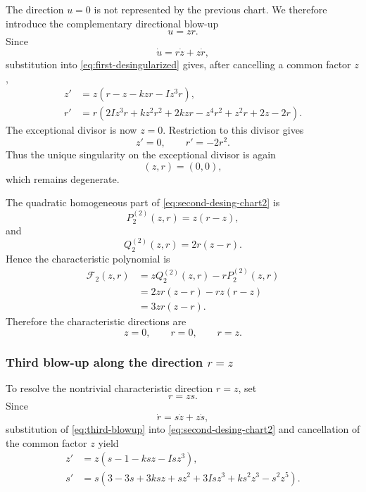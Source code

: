 \documentclass[11pt,reqno]{amsart}
\theoremstyle{plain}
\theoremstyle{definition}
\theoremstyle{remark}
\begin{document}
The direction $u=0$ is not represented by the previous chart.
We therefore introduce the complementary directional blow-up
\begin{equation}
\label{eq:second-blowup-chart2}
u=zr.
\end{equation}
Since
\[
\dot u=r\dot z+z\dot r,
\]
substitution into \eqref{eq:first-desingularized} gives, after
cancelling a common factor $z$,
\begin{equation}
\label{eq:second-desing-chart2}
\boxed{
\begin{aligned}
z'
&=
z\left(
r-z-kzr-Iz^3r
\right),
\\
r'
&=
r\left(
2Iz^3r
+kz^2r^2
+2kzr
-z^4r^2
+z^2r
+2z
-2r
\right).
\end{aligned}}
\end{equation}
The exceptional divisor is now $z=0$. Restriction to this divisor
gives
\[
z'=0,
\qquad
r'=-2r^2.
\]
Thus the unique singularity on the exceptional divisor is again
\[
(z,r)=(0,0),
\]
which remains degenerate.

The quadratic homogeneous part of
\eqref{eq:second-desing-chart2} is
\[
P^{(2)}_2(z,r)=z(r-z),
\]
and
\[
Q^{(2)}_2(z,r)=2r(z-r).
\]
Hence the characteristic polynomial is
\begin{align*}
\mathcal F_2(z,r)
&=
zQ^{(2)}_2(z,r)-rP^{(2)}_2(z,r)
\\
&=
2zr(z-r)-rz(r-z)
\\
&=
3zr(z-r).
\end{align*}
Therefore the characteristic directions are
\[
z=0,
\qquad
r=0,
\qquad
r=z.
\]

\subsubsection{Third blow-up along the direction $r=z$}

To resolve the nontrivial characteristic direction $r=z$, set
\begin{equation}
\label{eq:third-blowup}
r=zs.
\end{equation}
Since
\[
\dot r=s\dot z+z\dot s,
\]
substitution of \eqref{eq:third-blowup} into
\eqref{eq:second-desing-chart2} and cancellation of the common factor
$z$ yield
\begin{equation}
\label{eq:third-desing}
\boxed{
\begin{aligned}
z'
&=
z
\left(
s-1-ksz-Isz^3
\right),
\\
s'
&=
s
\left(
3-3s
+3ksz
+sz^2
+3Isz^3
+ks^2z^3
-s^2z^5
\right).
\end{aligned}}
\end{equation}
\end{document}
